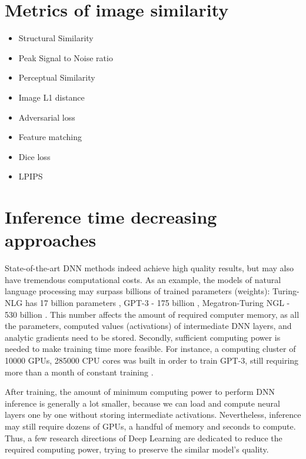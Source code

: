 \section{Metrics of image similarity}
\label{lit:metrics}
\begin{itemize}
	\item Structural Similarity
	\item Peak Signal to Noise ratio
	\item Perceptual Similarity
	\item Image L1 distance
	\item Adversarial loss
	\item Feature matching
	\item Dice loss
	\item LPIPS
\end{itemize}

\section{Inference time decreasing approaches}
\label{lit:dnn-speedup}

State-of-the-art DNN methods indeed achieve high quality results, but may also have tremendous computational costs. As an example, the models of natural language processing may surpass billions of trained parameters (weights): Turing-NLG has 17 billion parameters \cite{dnn:turingnlg20}, GPT-3 - 175 billion \cite{dnn:gpt3-20}, Megatron-Turing NGL - 530 billion \cite{dnn:megatron22}. This number affects the amount of required computer memory, as all the parameters, computed values (activations) of intermediate DNN layers, and analytic gradients need to be stored. Secondly, sufficient computing power is needed to make training time more feasible. For instance, a computing cluster of 10000 GPUs, 285000 CPU cores was built in order to train GPT-3, still requiring more than a month of constant training \cite{aux:openai-cluster-20}. 

After training, the amount of minimum computing power to perform DNN inference is generally a lot smaller, because we can load and compute neural layers one by one without storing intermediate activations. Nevertheless, inference may still require dozens of GPUs, a handful of memory and seconds to compute. Thus, a few research directions of Deep Learning are dedicated to reduce the required computing power, trying to preserve the similar model's quality.

